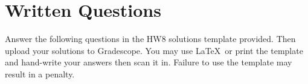 \section{Written Questions }
\label{sec:warmup}
Answer the following questions in the HW8 solutions template provided.  Then upload your solutions to Gradescope. You may use \LaTeX\ or print the template and hand-write your answers then scan it in. Failure to use the template may result in a penalty.

\clearpage



